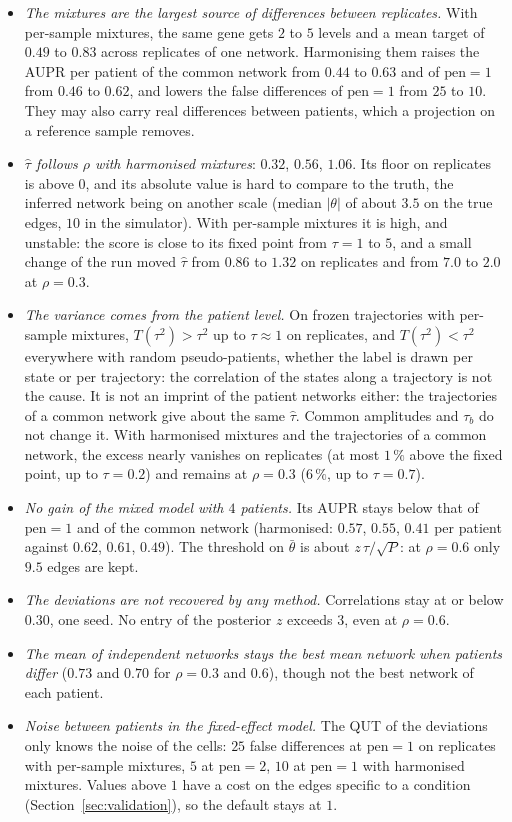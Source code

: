 \documentclass[a4paper, 11pt]{article}
\newcommand{\pen}{\mathrm{pen}}
\newcommand{\tb}{\bar\theta}
\theoremstyle{plain}
\theoremstyle{remark}
\begin{document}
\begin{itemize}[leftmargin=*]
\item \emph{The mixtures are the largest source of differences between replicates.} With per-sample mixtures, the same gene gets $2$ to $5$ levels and a mean target of $0.49$ to $0.83$ across replicates of one network. Harmonising them raises the AUPR per patient of the common network from $0.44$ to $0.63$ and of $\pen = 1$ from $0.46$ to $0.62$, and lowers the false differences of $\pen = 1$ from $25$ to $10$. They may also carry real differences between patients, which a projection on a reference sample removes.
\item \emph{$\hat\tau$ follows $\rho$ with harmonised mixtures}: $0.32$, $0.56$, $1.06$. Its floor on replicates is above $0$, and its absolute value is hard to compare to the truth, the inferred network being on another scale (median $|\theta|$ of about $3.5$ on the true edges, $10$ in the simulator). With per-sample mixtures it is high, and unstable: the score is close to its fixed point from $\tau = 1$ to $5$, and a small change of the run moved $\hat\tau$ from $0.86$ to $1.32$ on replicates and from $7.0$ to $2.0$ at $\rho = 0.3$.
\item \emph{The variance comes from the patient level.} On frozen trajectories with per-sample mixtures, $T(\tau^2) > \tau^2$ up to $\tau \approx 1$ on replicates, and $T(\tau^2) < \tau^2$ everywhere with random pseudo-patients, whether the label is drawn per state or per trajectory: the correlation of the states along a trajectory is not the cause. It is not an imprint of the patient networks either: the trajectories of a common network give about the same $\hat\tau$. Common amplitudes and $\tau_b$ do not change it. With harmonised mixtures and the trajectories of a common network, the excess nearly vanishes on replicates (at most $1\,\%$ above the fixed point, up to $\tau = 0.2$) and remains at $\rho = 0.3$ ($6\,\%$, up to $\tau = 0.7$).
\item \emph{No gain of the mixed model with $4$ patients.} Its AUPR stays below that of $\pen = 1$ and of the common network (harmonised: $0.57$, $0.55$, $0.41$ per patient against $0.62$, $0.61$, $0.49$). The threshold on $\tb$ is about $z\,\tau / \sqrt P$: at $\rho = 0.6$ only $9.5$ edges are kept.
\item \emph{The deviations are not recovered by any method.} Correlations stay at or below $0.30$, one seed. No entry of the posterior $z$ exceeds $3$, even at $\rho = 0.6$.
\item \emph{The mean of independent networks stays the best mean network when patients differ} ($0.73$ and $0.70$ for $\rho = 0.3$ and $0.6$), though not the best network of each patient.
\item \emph{Noise between patients in the fixed-effect model.} The QUT of the deviations only knows the noise of the cells: $25$ false differences at $\pen = 1$ on replicates with per-sample mixtures, $5$ at $\pen = 2$, $10$ at $\pen = 1$ with harmonised mixtures. Values above $1$ have a cost on the edges specific to a condition (Section~\ref{sec:validation}), so the default stays at $1$.
\end{itemize}
\end{document}
